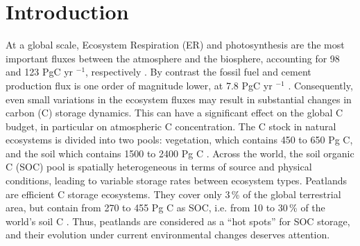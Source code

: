 \section{Introduction}
At a global scale, Ecosystem Respiration (ER) and photosynthesis are the most important fluxes between the atmosphere and the biosphere, accounting for 98 and 123 PgC yr $^{-1}$, respectively \citep{Bond-Lamberty2010,Beer2010}. 
By contrast the fossil fuel and cement production flux is one order of magnitude lower, at 7.8 PgC yr $^{-1}$ \citep{Ciais2014}.
Consequently, even small variations in the ecosystem fluxes may result in substantial changes in carbon (C) storage dynamics.
This can have a significant effect on the global C budget, in particular on atmospheric C concentration.
The C stock in natural ecosystems is divided into two pools: vegetation, which contains 450 to 650 Pg C, and the soil which contains 1500 to 2400 Pg C \citep{prentice2001,Eswaran1993,batjes1996}.
Across the world, the soil organic C (SOC) pool is spatially heterogeneous in terms of source and physical conditions, leading to variable storage rates between ecosystem types.
Peatlands are efficient C storage ecosystems.
They cover only 3\,\% of the global terrestrial area, but contain from 270 to 455 Pg C as SOC, i.e. from 10 to 30\,\% of the world's soil C \citep{gorham1991, turunen2002}.
Thus, peatlands are considered as a “hot spots” for SOC storage, and their evolution under current environmental changes deserves attention.


